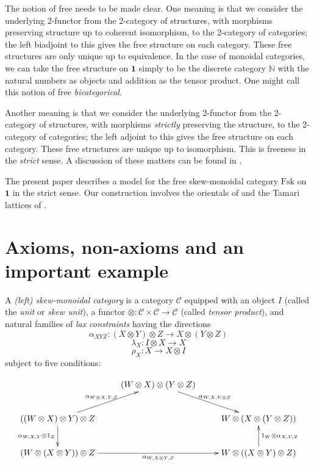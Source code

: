 \documentclass[a4paper,12pt,reqno]{amsart}
\theoremstyle{definition}
\theoremstyle{fact}
\theoremstyle{genquest}
\theoremstyle{step}
\newcommand{\lra}{\longrightarrow}
\def\CC{{\mathscr C}}
\begin{document}
The notion of free needs to be made clear. One meaning is that we consider the underlying 2-functor from the 
2-category of structures, with morphisms preserving structure up to coherent isomorphism, to the 2-category of categories;
the left biadjoint to this gives the free structure on each category. These free structures are only unique up to equivalence.
In the case of monoidal categories, we can take the free structure on $\mathbf{1}$ simply to be the discrete category $\mathbb{N}$
with the natural numbers as objects and addition as the tensor product. One might call this notion of free {\em bicategorical}.   

Another meaning is that we consider the underlying 2-functor from the 2-category of structures, with morphisms {\em strictly}
preserving the structure, to the 2-category of categories; the left adjoint to this gives the free structure on each category. 
These free structures are unique up to isomorphism. This is freeness in the {\em strict} sense. A discussion of these matters can be found in \cite{btc}.

The present paper describes a model for the free skew-monoidal category $\mathrm{Fsk}$ on $\mathbf{1}$ in the strict sense.
Our construction involves the orientals of \cite{aos} and the Tamari lattices of \cite{HT}.
 
\section{Axioms, non-axioms and an important example}

A {\em (left) skew-monoidal category} is a category $\CC$ equipped with an object $I$ (called the {\em unit} or {\em skew unit}),
a functor $\otimes : \CC \times \CC \lra \CC$ (called {\em tensor product}), and
natural families of {\em lax constraints} having the directions 
\begin{equation}
\alpha_{XYZ} : (X\otimes Y)\otimes Z \lra X\otimes (Y\otimes Z)
\end{equation}
\begin{equation}
\lambda_X : I\otimes X \lra X
\end{equation}
\begin{equation}
\rho_X :  X \lra X\otimes I
\end{equation}
subject to five conditions: 

\begin{equation}\label{pentagon}
\xymatrix{
& (W\otimes X)\otimes (Y\otimes Z) \ar[rd]^-{{\alpha_{W,X,Y\otimes Z}}}  & \\
((W\otimes X)\otimes Y)\otimes Z \ar[ru]^-{{\alpha_{W\otimes X,Y,Z}}} \ar[d]_-{{\alpha_{W,X,Y}} \otimes 1_Z} & & W\otimes (X\otimes (Y\otimes Z))  \\
(W\otimes (X\otimes Y))\otimes Z \ar[rr]_-{{\alpha_{W,X\otimes Y,Z}}} & & W\otimes ((X\otimes Y)\otimes Z) \ar[u]_-{1_W\otimes {\alpha_{X, Y,Z}}} }
\end{equation}
\end{document}
